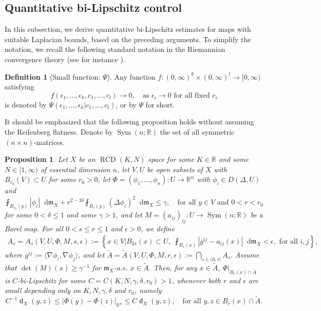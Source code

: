 \documentclass[11pt,reqno]{amsart}
\newtheorem{proposition}[theorem]{Proposition}
\theoremstyle{definition}
\newtheorem{definition}[theorem]{Definition}
\numberwithin{equation}{section}
\newcommand{\di}{\mathop{}\!\mathrm{d}}
\newcommand{\meas}{\mathfrak{m}}
\DeclareMathOperator{\dist}{\mathsf{d}}
\DeclareMathOperator{\RCD}{RCD}
\DeclareMathOperator{\Sym}{Sym}
\begin{document}
\subsection{Quantitative bi-Lipschitz control}
In this subsection, we derive quantitative bi-Lipschitz estimates for maps with suitable  Laplacian bounds, based on the preceding arguments.
To simplify the notation, we recall the following standard notation in the Riemannian convergence theory (see for instance \cite{Cbook}).
\begin{definition}[Small function: $\Psi$]\label{Psi}
    Any function $f:(0, \infty)^k \times(0, \infty)^l  \to [0, \infty)$ satisfying
    \begin{equation}
        f(\epsilon_1, \ldots, \epsilon_k, c_1, \ldots, c_l) \to 0,\quad \text{as $\epsilon_i \to 0$ for all fixed $c_i$}
    \end{equation}
    is denoted by $\Psi(\epsilon_1,\ldots,\epsilon_k|c_1,\ldots, c_l)$, or by $\Psi$ for short.
\end{definition}
It should be emphasized that the following proposition holds without assuming the Reifenberg flatness. Denote by $\Sym (n;\mathbb{R})$ the set of all symmetric $(n \times n)$-matrices. 
\begin{proposition}\label{bibilip}
    Let $X$ be an $\RCD(K, N)$ space for some $K \in \mathbb{R}$ and some $N \in [1, \infty)$ of essential dimension $n$, let $V, U$ be open subsets of $X$ with $B_{r_0}(V) \subset U$ for some $r_0>0$,
     let $\Phi=(\phi_1, \ldots, \phi_n):U\to \mathbb{R}^n$ with
    $\phi_i \in D(\Delta, U)$ and 
    \begin{equation}
\fint_{B_{r_0}(y)}|\phi_i|\di \meas_X+r^{2-2\delta}\fint_{B_r(y)}(\Delta \phi_i)^2\di \meas_X \le \gamma,\quad \text{for all $y \in V$ and $0<r<r_0$}
    \end{equation}
    for some $0<\delta \le 1$ and some $\gamma>1$,
    and let $M=(a_{ij})_{ij}: U \to \Sym (n;\mathbb{R})$ be a Borel map. 
    For all $0<s \le r\le 1$ and $\epsilon>0$, we define
\begin{align*}
A_s = A_s (V, U, \Phi, M, s, \epsilon) :=   \left\{x \in V \Big| B_{2s}(x)\subset U,\,\, \fint_{B_s (x)} \left| g^{i j} - a_{ij}(x) \right|\di \meas_X <\epsilon, \,\,\text{for all $i, j$}\right\},
\end{align*}
where $g^{ij} := \langle \nabla \phi_i, 
\nabla \phi_j \rangle$, and let
$
\tilde A= \tilde A (V, U, \Phi, M, r, \epsilon) := \bigcap_{s \in (0, r]} A_s.
$
Assume that
$
    \det(M)(x)\ge \gamma^{-1}$ for $\meas_X$-a.e. $x \in \tilde A$.
Then,  for any $x \in \tilde A$, $\Phi|_{B_r(x) \cap \tilde A}$ is $C$-bi-Lipschitz for some $C=C(K, N, \gamma, \delta, r_0)>1$, whenever both $r$ and $\epsilon$ are small depending only on $K, N, \gamma, \delta$ and $r_0$, namely
\begin{equation}
C^{-1}\dist_X(y, z) \le |\Phi(y)-\Phi(z)|_{\mathbb{R}^n}\le  C \dist_X(y, z), \quad \text{for all $y, z \in B_r(x)\cap \tilde A$.}
\end{equation}
\end{proposition}
\end{document}
